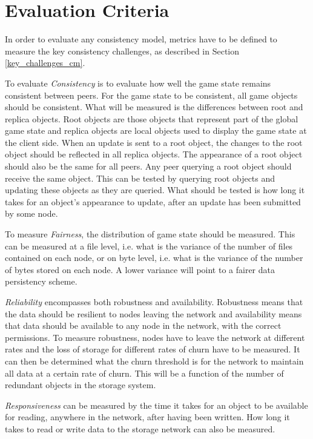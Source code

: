 \documentclass[10pt,a4paper,journal,cspaper,compsoc]{IEEEtran}
\begin{document}
\section{Evaluation Criteria}
\label{eval_crit}

In order to evaluate any consistency model, metrics have to be defined to measure the key consistency challenges, as described in Section
\ref{key_challenges_cm}.

To evaluate \emph{Consistency} is to evaluate how well the game state remains consistent between peers. For the game state to be consistent, all game
objects should be consistent. What will be measured is the differences between root and replica objects. Root objects are those objects that
represent part of the global game state and replica objects are local objects used to display the game state at the client side. When an update is
sent to a root object, the changes to the root object should be reflected in all replica objects. The appearance of a root object should also be the
same for all peers. Any peer querying a root object should receive the same object. This can be tested by querying root objects and updating these
objects as they are queried. What should be tested is how long it takes for an object's appearance to update, after an update has been submitted by
some node.

To measure \emph{Fairness}, the distribution of game state should be measured. This can be measured at a file level, i.e. what is the variance of the
number of files contained on each node, or on byte level, i.e. what is the variance of the number of bytes stored on each node. A lower variance will
point to a fairer data persistency scheme.

\emph{Reliability} encompasses both robustness and availability. Robustness means that the data should be resilient to nodes leaving the network and
availability means that data should be available to any node in the network, with the correct permissions. To measure robustness, nodes have to leave
the network at different rates and the loss of storage for different rates of churn have to be measured. It can then be determined what the churn
threshold is for the network to maintain all data at a certain rate of churn. This will be a function of the number of redundant objects in the
storage system.

\emph{Responsiveness} can be measured by the time it takes for an object to be available for reading, anywhere in the network, after having been
written. How long it takes to read or write data to the storage network can also be measured.
\end{document}
